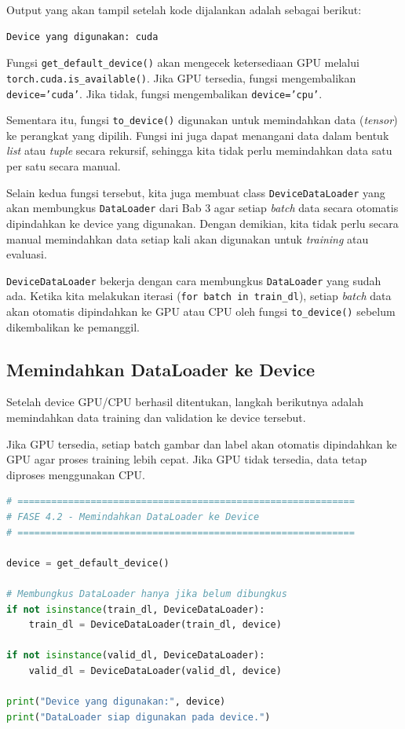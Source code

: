Output yang akan tampil setelah kode dijalankan adalah sebagai berikut:

\begin{outputcode}[H]
\begin{lstlisting}[language={}]
Device yang digunakan: cuda
\end{lstlisting}
\caption{Output penentuan device komputasi}
\end{outputcode}

Fungsi \texttt{get\_default\_device()} akan mengecek ketersediaan GPU melalui \texttt{torch.cuda.is\_available()}. Jika GPU tersedia, fungsi mengembalikan \texttt{device='cuda'}. Jika tidak, fungsi mengembalikan \texttt{device='cpu'}.

Sementara itu, fungsi \texttt{to\_device()} digunakan untuk memindahkan data (\textit{tensor}) ke perangkat yang dipilih. Fungsi ini juga dapat menangani data dalam bentuk \textit{list} atau \textit{tuple} secara rekursif, sehingga kita tidak perlu memindahkan data satu per satu secara manual.

Selain kedua fungsi tersebut, kita juga membuat class \texttt{DeviceDataLoader} yang akan membungkus \texttt{DataLoader} dari Bab 3 agar setiap \textit{batch} data secara otomatis dipindahkan ke device yang digunakan. Dengan demikian, kita tidak perlu secara manual memindahkan data setiap kali akan digunakan untuk \textit{training} atau evaluasi.

\texttt{DeviceDataLoader} bekerja dengan cara membungkus \texttt{DataLoader} yang sudah ada. Ketika kita melakukan iterasi (\texttt{for batch in train\_dl}), setiap \textit{batch} data akan otomatis dipindahkan ke GPU atau CPU oleh fungsi \texttt{to\_device()} sebelum dikembalikan ke pemanggil.

\subsection{Memindahkan DataLoader ke Device}

Setelah device GPU/CPU berhasil ditentukan, langkah berikutnya adalah memindahkan data training dan validation ke device tersebut.

Jika GPU tersedia, setiap batch gambar dan label akan otomatis dipindahkan ke GPU agar proses training lebih cepat. Jika GPU tidak tersedia, data tetap diproses menggunakan CPU.

\begin{lstlisting}[language=Python, caption=Memindahkan DataLoader ke device]
# ============================================================
# FASE 4.2 - Memindahkan DataLoader ke Device
# ============================================================

device = get_default_device()

# Membungkus DataLoader hanya jika belum dibungkus
if not isinstance(train_dl, DeviceDataLoader):
    train_dl = DeviceDataLoader(train_dl, device)

if not isinstance(valid_dl, DeviceDataLoader):
    valid_dl = DeviceDataLoader(valid_dl, device)

print("Device yang digunakan:", device)
print("DataLoader siap digunakan pada device.")
\end{lstlisting}

